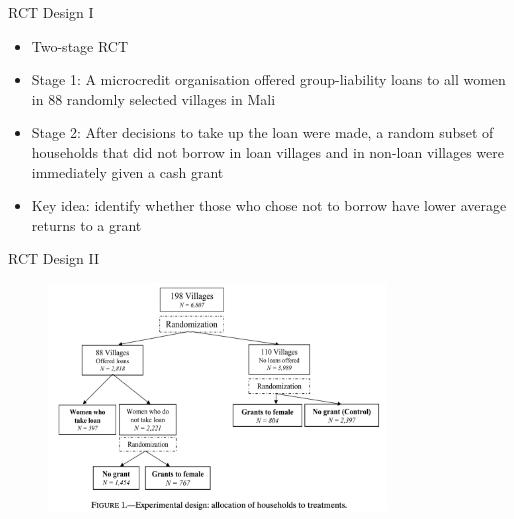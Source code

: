 \documentclass[11pt,notes=hide,aspectratio=169,mathserif]{beamer}
\begin{document}
\begin{frame}{RCT Design I}
\begin{itemize}
    \item Two-stage RCT 
    \item Stage 1: A microcredit organisation offered group-liability loans to all women in 88 randomly selected villages in Mali 
    \item Stage 2: After decisions to take up the loan were made, a random subset of households that did not borrow in loan villages and in non-loan villages were immediately given a cash grant
    \item Key idea: identify whether those who chose not to borrow have lower average returns to a grant
\end{itemize}
\end{frame}

\begin{frame}{RCT Design II}
    \begin{figure}
            \centering
            \includegraphics[width=0.8\textwidth]{inputs/fig3.png}
    \end{figure}
\end{frame}
\end{document}
